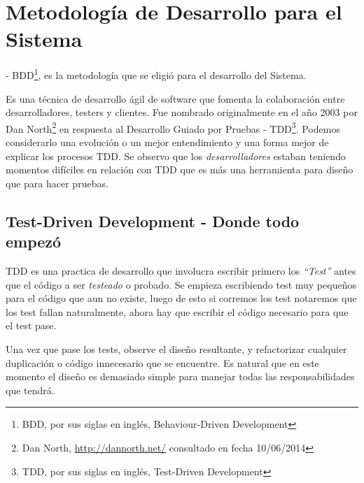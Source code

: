
\chapter{Metodología de Desarrollo para el Sistema}

 - BDD\footnote{BDD, por sus
siglas en inglés, Behaviour-Driven Development}, es la metodología que se eligió
para el desarrollo del Sistema.

Es una técnica de desarrollo ágil de software que fomenta la colaboración
entre desarrolladores, testers y clientes. Fue nombrado originalmente en el año
2003 por Dan North\footnote{Dan North, \url{http://dannorth.net/} consultado en
fecha 10/06/2014} en respuesta al Desarrollo Guiado por Pruebas - TDD\footnote{TDD,
por sus siglas en inglés, Test-Driven Development}. Podemos considerarlo una evolución
o un mejor entendimiento y una forma mejor de explicar los procesos TDD. Se observo
que los {\it desarrolladores} estaban teniendo momentos difíciles en relación
con TDD que es más una herramienta para diseño que para hacer pruebas.


\section{Test-Driven Development - Donde todo empezó}
TDD es una practica de desarrollo que involucra escribir primero los {\it ``Test''}
antes que el código a ser {\it testeado} o probado. Se empieza escribiendo test
muy pequeños para el código que aun no existe, luego de esto si corremos los test
notaremos que los test fallan naturalmente, ahora hay que escribir el código
necesario para que el test pase.

Una vez que pase los tests, observe el diseño resultante, y refactorizar cualquier
duplicación o código innecesario que se encuentre. Es natural que en este momento
el diseño es demasiado simple para manejar todas las responsabilidades que tendrá.

